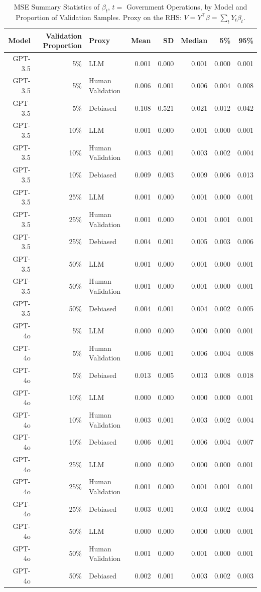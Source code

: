 \begin{table}

\caption{MSE Summary Statistics of $\beta_{t}$, $t=$ Government Operations, by Model and Proportion of Validation Samples.
      Proxy on the RHS: $V = Y^\top \beta = \sum_{t} Y_t \beta_t$.}
\centering
\begin{tabular}[t]{rrlrrrrr}
\toprule
Model & Validation Proportion & Proxy & Mean & SD & Median & 5\% & 95\%\\
\midrule
GPT-3.5 & 5\% & LLM & 0.001 & 0.000 & 0.001 & 0.000 & 0.001\\
GPT-3.5 & 5\% & Human Validation & 0.006 & 0.001 & 0.006 & 0.004 & 0.008\\
GPT-3.5 & 5\% & Debiased & 0.108 & 0.521 & 0.021 & 0.012 & 0.042\\
GPT-3.5 & 10\% & LLM & 0.001 & 0.000 & 0.001 & 0.000 & 0.001\\
GPT-3.5 & 10\% & Human Validation & 0.003 & 0.001 & 0.003 & 0.002 & 0.004\\
GPT-3.5 & 10\% & Debiased & 0.009 & 0.003 & 0.009 & 0.006 & 0.013\\
GPT-3.5 & 25\% & LLM & 0.001 & 0.000 & 0.001 & 0.000 & 0.001\\
GPT-3.5 & 25\% & Human Validation & 0.001 & 0.000 & 0.001 & 0.001 & 0.001\\
GPT-3.5 & 25\% & Debiased & 0.004 & 0.001 & 0.005 & 0.003 & 0.006\\
GPT-3.5 & 50\% & LLM & 0.001 & 0.000 & 0.001 & 0.000 & 0.001\\
GPT-3.5 & 50\% & Human Validation & 0.001 & 0.000 & 0.001 & 0.000 & 0.001\\
GPT-3.5 & 50\% & Debiased & 0.004 & 0.001 & 0.004 & 0.002 & 0.005\\
GPT-4o & 5\% & LLM & 0.000 & 0.000 & 0.000 & 0.000 & 0.001\\
GPT-4o & 5\% & Human Validation & 0.006 & 0.001 & 0.006 & 0.004 & 0.008\\
GPT-4o & 5\% & Debiased & 0.013 & 0.005 & 0.013 & 0.008 & 0.018\\
GPT-4o & 10\% & LLM & 0.000 & 0.000 & 0.000 & 0.000 & 0.001\\
GPT-4o & 10\% & Human Validation & 0.003 & 0.001 & 0.003 & 0.002 & 0.004\\
GPT-4o & 10\% & Debiased & 0.006 & 0.001 & 0.006 & 0.004 & 0.007\\
GPT-4o & 25\% & LLM & 0.000 & 0.000 & 0.000 & 0.000 & 0.001\\
GPT-4o & 25\% & Human Validation & 0.001 & 0.000 & 0.001 & 0.001 & 0.001\\
GPT-4o & 25\% & Debiased & 0.003 & 0.001 & 0.003 & 0.002 & 0.004\\
GPT-4o & 50\% & LLM & 0.000 & 0.000 & 0.000 & 0.000 & 0.001\\
GPT-4o & 50\% & Human Validation & 0.001 & 0.000 & 0.001 & 0.000 & 0.001\\
GPT-4o & 50\% & Debiased & 0.002 & 0.001 & 0.003 & 0.002 & 0.003\\
\bottomrule
\end{tabular}
\end{table}
